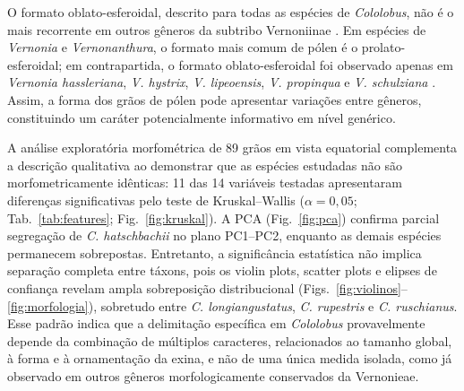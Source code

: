 \documentclass[pdflatex,sn-mathphys-num]{sn-jnl}
\begin{document}
O formato oblato-esferoidal, descrito para todas as espécies de \textit{Cololobus}, não é o mais recorrente em outros gêneros da subtribo Vernoniinae \cite{dematteis2008,vega2011}. Em espécies de \textit{Vernonia} e \textit{Vernonanthura}, o formato mais comum de pólen é o prolato-esferoidal; em contrapartida, o formato oblato-esferoidal foi observado apenas em \textit{Vernonia hassleriana}, \textit{V. hystrix}, \textit{V. lipeoensis}, \textit{V. propinqua} e \textit{V. schulziana} \cite{dematteis2008,vega2011}. Assim, a forma dos grãos de pólen pode apresentar variações entre gêneros, constituindo um caráter potencialmente informativo em nível genérico.

A análise exploratória morfométrica de 89 grãos em vista equatorial complementa a descrição qualitativa ao demonstrar que as espécies estudadas não são morfometricamente idênticas: 11 das 14 variáveis testadas apresentaram diferenças significativas pelo teste de Kruskal--Wallis ($\alpha = 0{,}05$; Tab.~\ref{tab:features}; Fig.~\ref{fig:kruskal}). A PCA (Fig.~\ref{fig:pca}) confirma parcial segregação de \textit{C. hatschbachii} no plano PC1--PC2, enquanto as demais espécies permanecem sobrepostas. Entretanto, a significância estatística não implica separação completa entre táxons, pois os violin plots, scatter plots e elipses de confiança revelam ampla sobreposição distribucional (Figs.~\ref{fig:violinos}--\ref{fig:morfologia}), sobretudo entre \textit{C. longiangustatus}, \textit{C. rupestris} e \textit{C. ruschianus}. Esse padrão indica que a delimitação específica em \textit{Cololobus} provavelmente depende da combinação de múltiplos caracteres, relacionados ao tamanho global, à forma e à ornamentação da exina, e não de uma única medida isolada, como já observado em outros gêneros morfologicamente conservados da Vernonieae.
\end{document}
